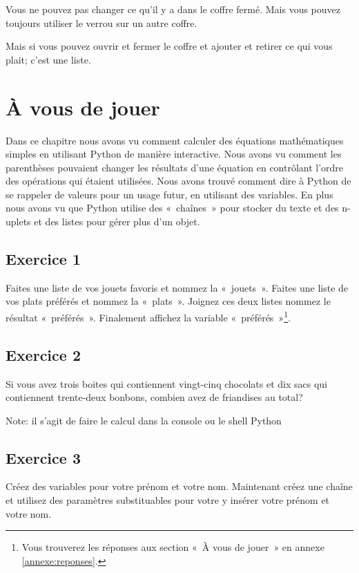 Vous ne pouvez pas changer ce qu'il y a dans le coffre fermé. Mais vous pouvez toujours utiliser le verrou  sur un autre coffre.

Mais si vous pouvez ouvrir et fermer le coffre et ajouter et retirer ce qui vous plait; c'est une liste.

\section{À vous de jouer\label{PRATIQUE:8}}

Dans ce chapitre nous avons vu comment calculer des équations mathématiques simples en utilisant Python de manière interactive. Nous avons vu comment les parenthèses pouvaient changer les résultats d'une équation en contrôlant l'ordre des opérations qui étaient utilisées. Nous avons trouvé comment dire à Python de se rappeler de valeurs pour un usage futur, en utilisant des variables. En plus nous avons vu que Python utilise des «~chaînes~» pour stocker du texte et des n-uplets et des listes pour gérer plus d'un objet.

\subsection{Exercice 1}
Faites une liste de vos jouets favoris et nommez la «~jouets~». Faites une liste de vos plats préférés et nommez la «~plats~». Joignez ces deux listes nommez le résultat «~préférés~». Finalement affichez la variable «~préférés~»\footnote{Vous trouverez les réponses aux section «~À vous de jouer~» en annexe \ref{annexe:reponses}.}.

\subsection{Exercice 2}
Si vous avez trois boites qui contiennent vingt-cinq chocolats et dix sacs qui contiennent trente-deux bonbons, combien avez de friandises au total? 

Note: il s'agit de faire le calcul dans la console ou le shell Python

\subsection{Exercice 3}
Créez des variables pour votre prénom et votre nom. Maintenant créez une chaîne et utilisez des paramètres substituables pour votre y insérer votre prénom et votre nom.\\


